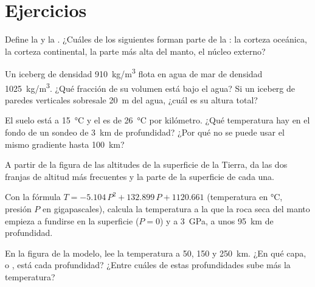 \section{Ejercicios}

\begin{exercise}[$\star$]\label{exo:g11:lithosphere-asthenosphere:1}
Define la  y la . ¿Cuáles de los siguientes forman parte
de la : la corteza oceánica, la corteza continental, la parte más
alta del manto, el núcleo externo?
\end{exercise}

\begin{exercise}[$\star$]\label{exo:g11:lithosphere-asthenosphere:2}
Un iceberg de densidad \qty{910}{kg/m^3} flota en agua de mar de densidad
\qty{1025}{kg/m^3}. ¿Qué fracción de su volumen está bajo el agua? Si un
iceberg de paredes verticales sobresale \qty{20}{m} del agua, ¿cuál es su
altura total?
\end{exercise}

\begin{exercise}[$\star$]\label{exo:g11:lithosphere-asthenosphere:3}
El suelo está a \qty{15}{\celsius} y el  es de
\qty{26}{\celsius} por kilómetro. ¿Qué temperatura hay en el fondo de un
sondeo de \qty{3}{km} de profundidad? ¿Por qué no se puede usar el mismo
gradiente hasta \qty{100}{km}?
\end{exercise}

\begin{exercise}[$\star$]\label{exo:g11:lithosphere-asthenosphere:4}
A partir de la figura de las altitudes de la superficie de la Tierra, da las
dos franjas de altitud más frecuentes y la parte de la superficie de cada una.
\end{exercise}

\begin{exercise}[$\star$]\label{exo:g11:lithosphere-asthenosphere:5}
Con la fórmula $T = -5.104\,P^2 + 132.899\,P + 1120.661$ (temperatura en
\unit{\celsius}, presión $P$ en gigapascales), calcula la temperatura a la que
la roca seca del manto empieza a fundirse en la superficie ($P = 0$) y a
\qty{3}{GPa}, a unos \qty{95}{km} de profundidad.
\end{exercise}

\begin{exercise}[$\star\star$]\label{exo:g11:lithosphere-asthenosphere:6}
En la figura de la  modelo, lee la temperatura a 50, 150 y
\qty{250}{km}. ¿En qué capa,  o , está cada profundidad?
¿Entre cuáles de estas profundidades sube más la temperatura?
\end{exercise}

